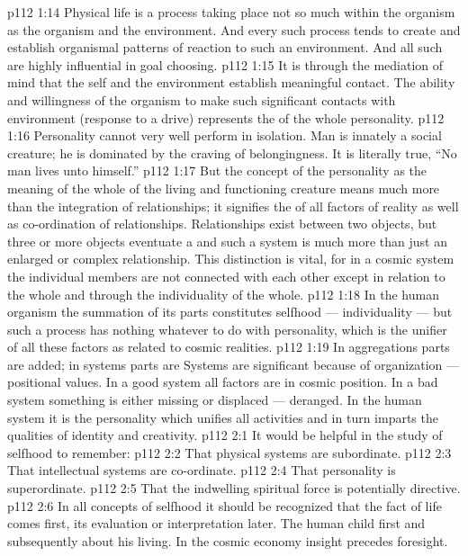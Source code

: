 \vs p112 1:14 Physical life is a process taking place not so much within the organism as  the organism and the environment. And every such process tends to create and establish organismal patterns of reaction to such an environment. And all such  are highly influential in goal choosing.
\vs p112 1:15 It is through the mediation of mind that the self and the environment establish meaningful contact. The ability and willingness of the organism to make such significant contacts with environment (response to a drive) represents the  of the whole personality.
\vs p112 1:16 Personality cannot very well perform in isolation. Man is innately a social creature; he is dominated by the craving of belongingness. It is literally true, “No man lives unto himself.”
\vs p112 1:17 But the concept of the personality as the meaning of the whole of the living and functioning creature means much more than the integration of relationships; it signifies the  of all factors of reality as well as co\hyp{}ordination of relationships. Relationships exist between two objects, but three or more objects eventuate a  and such a system is much more than just an enlarged or complex relationship. This distinction is vital, for in a cosmic system the individual members are not connected with each other except in relation to the whole and through the individuality of the whole.
\vs p112 1:18 In the human organism the summation of its parts constitutes selfhood --- individuality --- but such a process has nothing whatever to do with personality, which is the unifier of all these factors as related to cosmic realities.
\vs p112 1:19 In aggregations parts are added; in systems parts are  Systems are significant because of organization --- positional values. In a good system all factors are in cosmic position. In a bad system something is either missing or displaced --- deranged. In the human system it is the personality which unifies all activities and in turn imparts the qualities of identity and creativity.
\vs p112 2:1 It would be helpful in the study of selfhood to remember:
\vs p112 2:2 \bibnobreakspace That physical systems are subordinate.
\vs p112 2:3 \bibnobreakspace That intellectual systems are co\hyp{}ordinate.
\vs p112 2:4 \bibnobreakspace That personality is superordinate.
\vs p112 2:5 \bibnobreakspace That the indwelling spiritual force is potentially directive.
\vs p112 2:6 \pc In all concepts of selfhood it should be recognized that the fact of life comes first, its evaluation or interpretation later. The human child first  and subsequently  about his living. In the cosmic economy insight precedes foresight.
